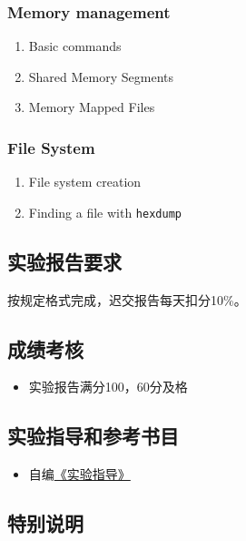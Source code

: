 \documentclass{wx672ctexart}
\begin{document}
\subsubsection{Memory management}
\label{sec-3-4-3}

\begin{enumerate}
\item Basic commands
\item Shared Memory Segments
\item Memory Mapped Files
\end{enumerate}

\subsubsection{File System}
\label{sec-3-4-4}

\begin{enumerate}
\item File system creation
\item Finding a file with \texttt{hexdump}
\end{enumerate}

\subsection{实验报告要求}
\label{sec-3-5}

按规定格式完成，迟交报告每天扣分10\%。

\subsection{成绩考核}
\label{sec-3-6}

\begin{itemize}
\item 实验报告满分100，60分及格
\end{itemize}

\subsection{实验指导和参考书目}
\label{sec-3-7}

\begin{itemize}
\item 自编\href{http://cs6.swfu.edu.cn/~wx672/lecture_notes/os/lab.html}{《实验指导》}
\end{itemize}

\subsection{特别说明}
\label{sec-3-8}
\end{document}
